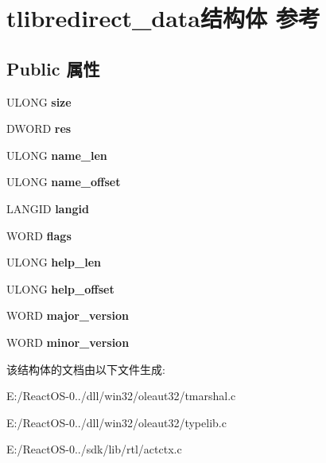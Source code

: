 \hypertarget{structtlibredirect__data}{}\section{tlibredirect\+\_\+data结构体 参考}
\label{structtlibredirect__data}
\subsection*{Public 属性}
\begin{DoxyCompactItemize}
\item 
\mbox{\label{structtlibredirect__data_a7afa277289ec40f4f67a10ea8236597f}} 
U\+L\+O\+NG {\bfseries size}
\item 
\mbox{\label{structtlibredirect__data_a09fe8e4133eb37416cdb444f53e479c2}} 
D\+W\+O\+RD {\bfseries res}
\item 
\mbox{\label{structtlibredirect__data_a98ed00e48281b86f48207db66ae456cf}} 
U\+L\+O\+NG {\bfseries name\+\_\+len}
\item 
\mbox{\label{structtlibredirect__data_a16aa7731b0baff66a246fecca41da284}} 
U\+L\+O\+NG {\bfseries name\+\_\+offset}
\item 
\mbox{\label{structtlibredirect__data_ab0f0e5592a0468adc04ab37ffa6314e7}} 
L\+A\+N\+G\+ID {\bfseries langid}
\item 
\mbox{\label{structtlibredirect__data_ade4a7ad98c4323c17d539bd9cd6d3a31}} 
W\+O\+RD {\bfseries flags}
\item 
\mbox{\label{structtlibredirect__data_a3b493cf0762b16fcdcb7d6f1b42d4919}} 
U\+L\+O\+NG {\bfseries help\+\_\+len}
\item 
\mbox{\label{structtlibredirect__data_a6d5873948f2e98f92480961ee81a7e61}} 
U\+L\+O\+NG {\bfseries help\+\_\+offset}
\item 
\mbox{\label{structtlibredirect__data_aec5b530e5405031b7eb6b6f347d64610}} 
W\+O\+RD {\bfseries major\+\_\+version}
\item 
\mbox{\label{structtlibredirect__data_a885ea47b5805e6e13cfc142e8fd02726}} 
W\+O\+RD {\bfseries minor\+\_\+version}
\end{DoxyCompactItemize}


该结构体的文档由以下文件生成\+:\begin{DoxyCompactItemize}
\item 
E\+:/\+React\+O\+S-\/0../dll/win32/oleaut32/tmarshal.\+c\item 
E\+:/\+React\+O\+S-\/0../dll/win32/oleaut32/typelib.\+c\item 
E\+:/\+React\+O\+S-\/0../sdk/lib/rtl/actctx.\+c\end{DoxyCompactItemize}
